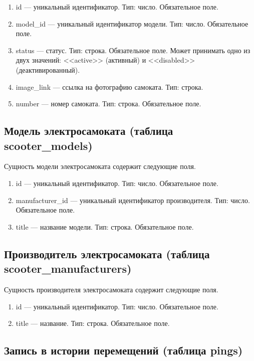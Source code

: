 \begin{enumerate}
    \item id --- уникальный идентификатор. Тип: число. Обязательное поле.
    \item model\_id --- уникальный идентификатор модели. Тип: число. Обязательное поле.
    \item status --- статус. Тип: строка. Обязательное поле. Может принимать одно из двух значений: <<active>> (активный) и <<disabled>> (деактивированный).
    \item image\_link --- ссылка на фотографию самоката. Тип: строка.
    \item number --- номер самоката. Тип: строка. Обязательное поле.
\end{enumerate}

\subsection{Модель электросамоката (таблица scooter\_models)}

Сущность модели электросамоката содержит следующие поля.

\begin{enumerate}
    \item id --- уникальный идентификатор. Тип: число. Обязательное поле.
    \item manufacturer\_id --- уникальный идентификатор производителя. Тип: число. Обязательное поле.
    \item title --- название модели. Тип: строка. Обязательное поле.
\end{enumerate}

\subsection{Производитель электросамоката (таблица scooter\_manufacturers)}

Сущность производителя электросамоката содержит следующие поля.

\begin{enumerate}
    \item id --- уникальный идентификатор. Тип: число. Обязательное поле.
    \item title --- название. Тип: строка. Обязательное поле.
\end{enumerate}

\subsection{Запись в истории перемещений (таблица pings)}

